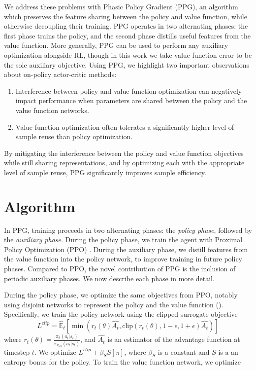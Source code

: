 \documentclass{article}
\begin{document}
We address these problems with Phasic Policy Gradient (PPG), an algorithm which preserves the feature sharing between the policy and value function, while otherwise decoupling their training. PPG operates in two alternating phases: the first phase trains the policy, and the second phase distills useful features from the value function. More generally, PPG can be used to perform any auxiliary optimization alongside RL, though in this work we take value function error to be the sole auxiliary objective. Using PPG, we highlight two important observations about on-policy actor-critic methods:

\begin{enumerate}
  \item Interference between policy and value function optimization can negatively impact performance when parameters are shared between the policy and the value function networks.
  \item Value function optimization often tolerates a significantly higher level of sample reuse than policy optimization.
\end{enumerate}

By mitigating the interference between the policy and value function objectives while still sharing representations, and by optimizing each with the appropriate level of sample reuse, PPG significantly improves sample efficiency.

\section{Algorithm} \label{sec:algorithm}

In PPG, training proceeds in two alternating phases: the \textit{policy phase}, followed by the \textit{auxiliary phase}. During the policy phase, we train the agent with Proximal Policy Optimization (PPO) \citep{ppo}. During the auxiliary phase, we distill features from the value function into the policy network, to improve training in future policy phases. Compared to PPO, the novel contribution of PPG is the inclusion of periodic auxiliary phases. We now describe each phase in more detail.

During the policy phase, we optimize the same objectives from PPO, notably using disjoint networks to represent the policy and the value function (). Specifically, we train the policy network using the clipped surrogate objective $$L^{clip} = \mathbb{\hat{E}}_t\left[\min(r_t(\theta)\hat{A_t}, \text{clip}(r_t(\theta), 1 - \epsilon, 1 + \epsilon)\hat{A_t})\right]$$ where $r_t(\theta) = \frac{\pi_\theta(a_t | s_t)}{\pi_{\theta_{old}}(a_t | s_t)}$, and $\hat{A_t}$ is an estimator of the advantage function at timestep $t$. We optimize $L^{clip} + \beta_SS[\pi]$, where $\beta_S$ is a constant and $S$ is a an entropy bonus for the policy. To train the value function network, we optimize
\end{document}
